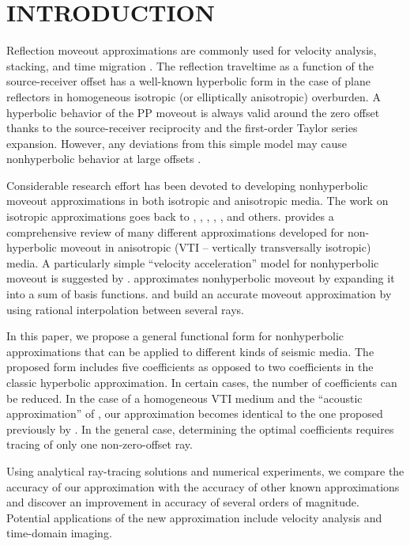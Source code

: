 \section{INTRODUCTION}

Reflection moveout approximations are commonly used for velocity
analysis, stacking, and time migration \cite[]{yilmaz}.  The
reflection traveltime as a function of the source-receiver offset has
a well-known hyperbolic form in the case of plane reflectors in
homogeneous isotropic (or elliptically anisotropic) overburden. A
hyperbolic behavior of the PP moveout is always valid around the zero
offset thanks to the source-receiver reciprocity and the first-order
Taylor series expansion. However, any deviations from this simple
model may cause nonhyperbolic behavior at large offsets
\cite[]{fandg}.

Considerable research effort has been devoted to developing
nonhyperbolic moveout approximations in both isotropic and anisotropic
media. The work on isotropic approximations goes back to
\cite{bolshykh}, \cite{GEO34-06-08590881}, \cite{malovichko},
\cite{GEO53-02-01430157}, \cite{GEO59-06-09830999}, and
others. \cite{fowler} provides a comprehensive review of many
different approximations developed for non-hyperbolic moveout in
anisotropic (VTI -- vertically transversally isotropic) media. A
particularly simple ``velocity acceleration'' model for nonhyperbolic
moveout is suggested by
\cite{taner1,taner2}. \cite{causse} approximates nonhyperbolic moveout
by expanding it into a sum of basis functions. \cite{douma} and
\cite{douma2} build an accurate moveout approximation by using
rational interpolation between several rays.

In this paper, we propose a general functional form for nonhyperbolic
approximations that can be applied to different kinds of seismic
media. The proposed form includes five coefficients as opposed to two
coefficients in the classic hyperbolic approximation. In certain
cases, the number of coefficients can be reduced. In the case of a
homogeneous VTI medium and the ``acoustic approximation'' of
\cite{GEO63-02-06230631}, our approximation becomes identical to the
one proposed previously by \cite{GPR52-03-02470259}. In the general
case, determining the optimal coefficients requires tracing of only
one non-zero-offset ray.

Using analytical ray-tracing solutions and numerical experiments, we
compare the accuracy of our approximation with the accuracy of other
known approximations and discover an improvement in accuracy of
several orders of magnitude. Potential applications of the new
approximation include velocity analysis and time-domain imaging.

